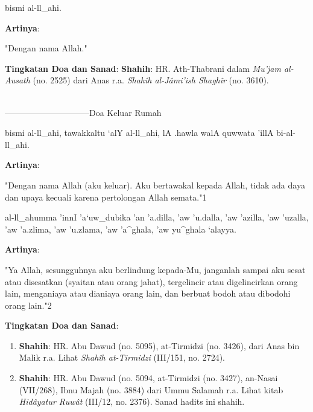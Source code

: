 \documentclass[a4paper,12pt]{article}
\begin{document}
\begin{arabtext}
\noindent
bismi al-ll_ahi.\\
\end{arabtext}
\noindent
\textbf{Artinya}:
\par
\indent
"Dengan nama Allah."\\
\par
\noindent
\textbf{Tingkatan Doa dan Sanad}: \textbf{Shahih}: HR. Ath-Thabrani dalam
\textit{Mu'jam al-Ausath} (no. 2525) dari Anas r.a. \textit{Shah\^{i}h 
al-J\^{a}mi'ish Shagh\^{i}r} (no. 3610). \\\\
\par
{}------------------------------Doa Keluar Rumah
\begin{arabtext}
\noindent
bismi al-ll_ahi, tawakkaltu `alY al-ll_ahi, lA .hawla walA quwwata 'illA 
bi-al-ll_ahi.\\
\end{arabtext}
\noindent
\textbf{Artinya}:
\par
\indent
"Dengan nama Allah (aku keluar). Aku bertawakal kepada Allah, tidak ada 
daya dan upaya kecuali karena pertolongan Allah semata."{\scriptsize 1}\\
\begin{arabtext}
\noindent
al-ll_ahumma 'innI 'a`uw_dubika 'an 'a.dilla, 'aw 'u.dalla, 'aw 'azilla, 
'aw 'uzalla, 'aw 'a.zlima, 'aw 'u.zlama, 'aw 'a^ghala, 'aw yu^ghala 
`alayya.\\
\end{arabtext}
\noindent
\textbf{Artinya}:
\par
\indent
"Ya Allah, sesungguhnya aku berlindung kepada-Mu, janganlah sampai aku 
sesat atau disesatkan (syaitan atau orang jahat), tergelincir atau 
digelincirkan orang lain, menganiaya atau dianiaya orang lain, dan berbuat 
bodoh atau dibodohi orang lain."{\scriptsize 2}\\
\par
\noindent
\textbf{Tingkatan Doa dan Sanad}:
\begin{enumerate}
\item \textbf{Shahih}: HR. Abu Dawud (no. 5095), at-Tirmidzi (no. 3426), 
dari Anas bin Malik r.a. Lihat \textit{Shah\^{i}h at-Tirmidzi} (III/151, 
no.  2724).
\item \textbf{Shahih}: HR. Abu Dawud (no. 5094, at-Tirmidzi (no. 3427), 
an-Nasai (VII/268), Ibnu Majah (no. 3884) dari Ummu Salamah r.a. Lihat 
kitab \textit{Hid\^{a}yatur Ruw\^{a}t} (III/12, no. 2376). Sanad hadits 
ini shahih.\\\\
\end{enumerate}
\end{document}
